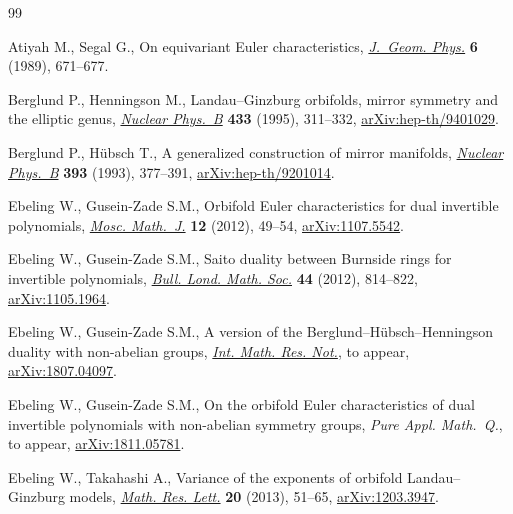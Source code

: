 \documentclass[pdftex]{sigma}
\numberwithin{equation}{section}
\begin{document}
\begin{thebibliography}{99}
\footnotesize\itemsep=0pt

Atiyah M., Segal G., On equivariant {E}uler characteristics, \href{https://doi.org/10.1016/0393-0440(89)90032-6}{\textit{J.~Geom.
 Phys.}} \textbf{6} (1989), 671--677.

Berglund P., Henningson M., Landau--{G}inzburg orbifolds, mirror symmetry and
 the elliptic genus, \href{https://doi.org/10.1016/0550-3213(94)00389-V}{\textit{Nuclear Phys.~B}} \textbf{433} (1995), 311--332,
 \href{https://arxiv.org/abs/hep-th/9401029}{arXiv:hep-th/9401029}.

Berglund P., H\"ubsch T., A generalized construction of mirror manifolds,
 \href{https://doi.org/10.1016/0550-3213(93)90250-S}{\textit{Nuclear Phys.~B}} \textbf{393} (1993), 377--391,
 \href{https://arxiv.org/abs/hep-th/9201014}{arXiv:hep-th/9201014}.

Ebeling W., Gusein-Zade S.M., Orbifold {E}uler characteristics for dual
 invertible polynomials, \href{https://doi.org/10.17323/1609-4514-2012-12-1-49-54}{\textit{Mosc. Math.~J.}} \textbf{12} (2012), 49--54,
 \href{https://arxiv.org/abs/1107.5542}{arXiv:1107.5542}.

Ebeling W., Gusein-Zade S.M., Saito duality between {B}urnside rings for
 invertible polynomials, \href{https://doi.org/10.1112/blms/bds014}{\textit{Bull. Lond. Math. Soc.}} \textbf{44} (2012),
 814--822, \href{https://arxiv.org/abs/1105.1964}{arXiv:1105.1964}.

Ebeling W., Gusein-Zade S.M., A version of the
 {B}erglund--{H}\"ubsch--{H}enningson duality with non-abelian groups,
 \href{https://doi.org/10.1093/imrn/rnz167}{\textit{Int. Math. Res. Not.}}, {t}o appear, \href{https://arxiv.org/abs/1807.04097}{arXiv:1807.04097}.

Ebeling W., Gusein-Zade S.M., On the orbifold {E}uler characteristics of dual
 invertible polynomials with non-abelian symmetry groups, \textit{Pure Appl.
 Math.~Q.}, {t}o appear, \href{https://arxiv.org/abs/1811.05781}{arXiv:1811.05781}.

Ebeling W., Takahashi A., Variance of the exponents of orbifold
 {L}andau--{G}inzburg models, \href{https://doi.org/10.4310/MRL.2013.v20.n1.a5}{\textit{Math. Res. Lett.}} \textbf{20} (2013),
 51--65, \href{https://arxiv.org/abs/1203.3947}{arXiv:1203.3947}.


\end{thebibliography}
\end{document}
